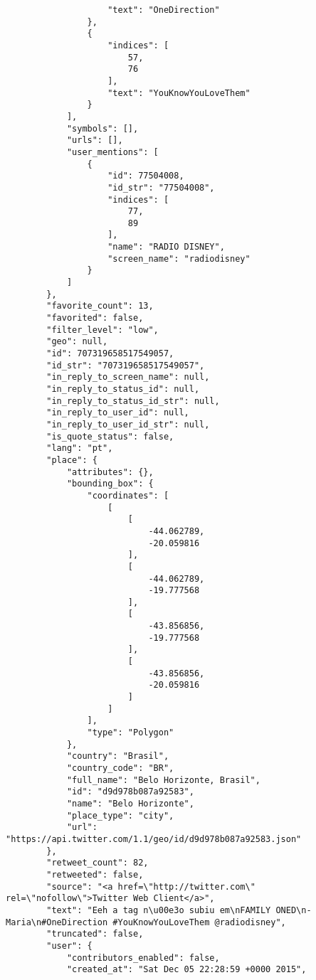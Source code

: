 \begin{lstlisting}
                    "text": "OneDirection"
                },
                {
                    "indices": [
                        57,
                        76
                    ],
                    "text": "YouKnowYouLoveThem"
                }
            ],
            "symbols": [],
            "urls": [],
            "user_mentions": [
                {
                    "id": 77504008,
                    "id_str": "77504008",
                    "indices": [
                        77,
                        89
                    ],
                    "name": "RADIO DISNEY",
                    "screen_name": "radiodisney"
                }
            ]
        },
        "favorite_count": 13,
        "favorited": false,
        "filter_level": "low",
        "geo": null,
        "id": 707319658517549057,
        "id_str": "707319658517549057",
        "in_reply_to_screen_name": null,
        "in_reply_to_status_id": null,
        "in_reply_to_status_id_str": null,
        "in_reply_to_user_id": null,
        "in_reply_to_user_id_str": null,
        "is_quote_status": false,
        "lang": "pt",
        "place": {
            "attributes": {},
            "bounding_box": {
                "coordinates": [
                    [
                        [
                            -44.062789,
                            -20.059816
                        ],
                        [
                            -44.062789,
                            -19.777568
                        ],
                        [
                            -43.856856,
                            -19.777568
                        ],
                        [
                            -43.856856,
                            -20.059816
                        ]
                    ]
                ],
                "type": "Polygon"
            },
            "country": "Brasil",
            "country_code": "BR",
            "full_name": "Belo Horizonte, Brasil",
            "id": "d9d978b087a92583",
            "name": "Belo Horizonte",
            "place_type": "city",
            "url": "https://api.twitter.com/1.1/geo/id/d9d978b087a92583.json"
        },
        "retweet_count": 82,
        "retweeted": false,
        "source": "<a href=\"http://twitter.com\" rel=\"nofollow\">Twitter Web Client</a>",
        "text": "Eeh a tag n\u00e3o subiu em\nFAMILY ONED\n- Maria\n#OneDirection #YouKnowYouLoveThem @radiodisney",
        "truncated": false,
        "user": {
            "contributors_enabled": false,
            "created_at": "Sat Dec 05 22:28:59 +0000 2015",

\end{lstlisting}
